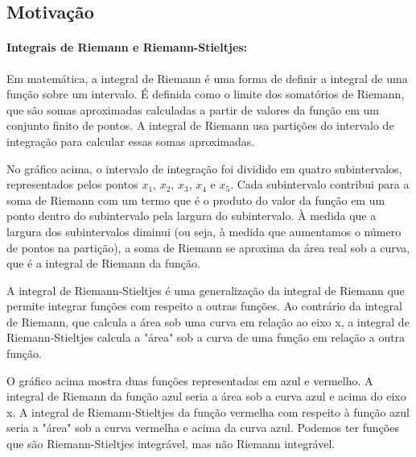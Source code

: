 \documentclass{article}
\begin{document}
\subsection{Motiva\c cão}
 \paragraph{Integrais de Riemann e Riemann-Stieltjes:}
Em matemática, a integral de Riemann é uma forma de definir a integral de uma
função sobre um intervalo. É definida como o limite dos somatórios de Riemann,
que são somas aproximadas calculadas a partir de valores da função em um
conjunto finito de pontos. A integral de Riemann usa partições do intervalo 
de integração para calcular essas somas aproximadas. 


No gráfico acima, o intervalo de integração foi dividido em quatro subintervalos,
representados pelos pontos $x_1$, $x_2$, $x_3$, $x_4$ e $x_5$.
Cada subintervalo contribui para a soma de Riemann com um termo que é o
produto do valor da função em um ponto dentro do subintervalo pela largura do
subintervalo. À medida que a largura dos subintervalos diminui (ou seja, à
medida que aumentamos o número de pontos na partição), a soma de Riemann se
aproxima da área real sob a curva, que é a integral de Riemann da função.

A integral de Riemann-Stieltjes é uma generalização da integral de Riemann
que permite integrar funções com respeito a outras funções. Ao contrário da
integral de Riemann, que calcula a área sob uma curva em relação ao eixo x,
a integral de Riemann-Stieltjes calcula a "área" sob a curva de uma função em
relação a outra função.


O gráfico acima mostra duas funções representadas em azul e vermelho.
A integral de Riemann da função azul seria a área sob a curva azul e acima
do eixo x. A integral de Riemann-Stieltjes da função vermelha com respeito à função
azul seria a "área" sob a curva vermelha e acima da curva azul. Podemos ter fun\c cões
que são Riemann-Stieltjes integrável, mas não Riemann integrável.
\end{document}
